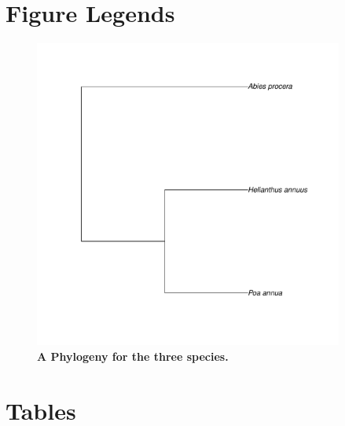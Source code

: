 \documentclass[10pt]{article}\usepackage[]{graphicx}\usepackage[]{color}
\begin{document}
\section*{Figure Legends}
\begin{figure}[!ht]
\begin{center}
\includegraphics[width=4in]{figure/phylomaticphylogeny.pdf}
\end{center}
\caption{
{\bf A Phylogeny for the three species.}
}
\label{fig:phylomatic}
\end{figure}


\section*{Tables}
\end{document}
